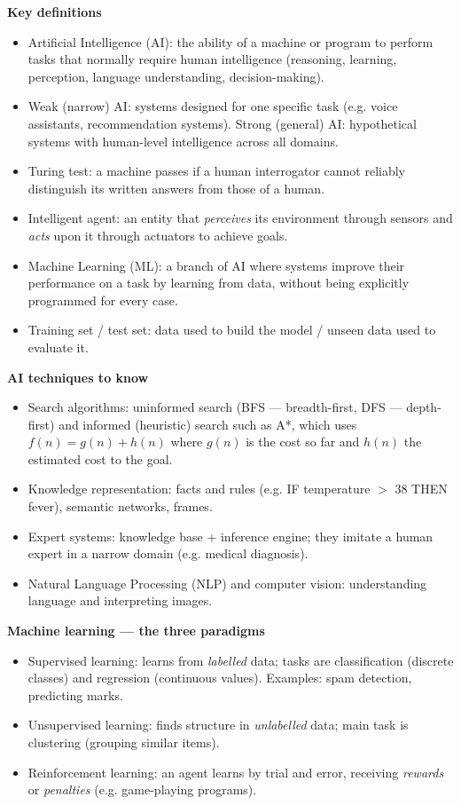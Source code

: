 \documentclass[11pt]{article}
\newcommand{\cle}[1]{{\popxbold\color{popdark}#1}}
\begin{document}
\begin{aretenir}
\textbf{Key definitions}
\begin{itemize}
\item \cle{Artificial Intelligence (AI)}: the ability of a machine or program to perform tasks that normally require human intelligence (reasoning, learning, perception, language understanding, decision-making).
\item \cle{Weak (narrow) AI}: systems designed for one specific task (e.g. voice assistants, recommendation systems). \cle{Strong (general) AI}: hypothetical systems with human-level intelligence across all domains.
\item \cle{Turing test}: a machine passes if a human interrogator cannot reliably distinguish its written answers from those of a human.
\item \cle{Intelligent agent}: an entity that \emph{perceives} its environment through sensors and \emph{acts} upon it through actuators to achieve goals.
\item \cle{Machine Learning (ML)}: a branch of AI where systems improve their performance on a task by learning from data, without being explicitly programmed for every case.
\item \cle{Training set / test set}: data used to build the model / unseen data used to evaluate it.
\end{itemize}

\textbf{AI techniques to know}
\begin{itemize}
\item \cle{Search algorithms}: uninformed search (BFS --- breadth-first, DFS --- depth-first) and informed (heuristic) search such as A*, which uses $f(n) = g(n) + h(n)$ where $g(n)$ is the cost so far and $h(n)$ the estimated cost to the goal.
\item \cle{Knowledge representation}: facts and rules (e.g. IF temperature $>$ 38 THEN fever), semantic networks, frames.
\item \cle{Expert systems}: knowledge base + inference engine; they imitate a human expert in a narrow domain (e.g. medical diagnosis).
\item \cle{Natural Language Processing (NLP)} and \cle{computer vision}: understanding language and interpreting images.
\end{itemize}

\textbf{Machine learning --- the three paradigms}
\begin{itemize}
\item \cle{Supervised learning}: learns from \emph{labelled} data; tasks are classification (discrete classes) and regression (continuous values). Examples: spam detection, predicting marks.
\item \cle{Unsupervised learning}: finds structure in \emph{unlabelled} data; main task is clustering (grouping similar items).
\item \cle{Reinforcement learning}: an agent learns by trial and error, receiving \emph{rewards} or \emph{penalties} (e.g. game-playing programs).
\end{itemize}


\end{aretenir}
\end{document}

